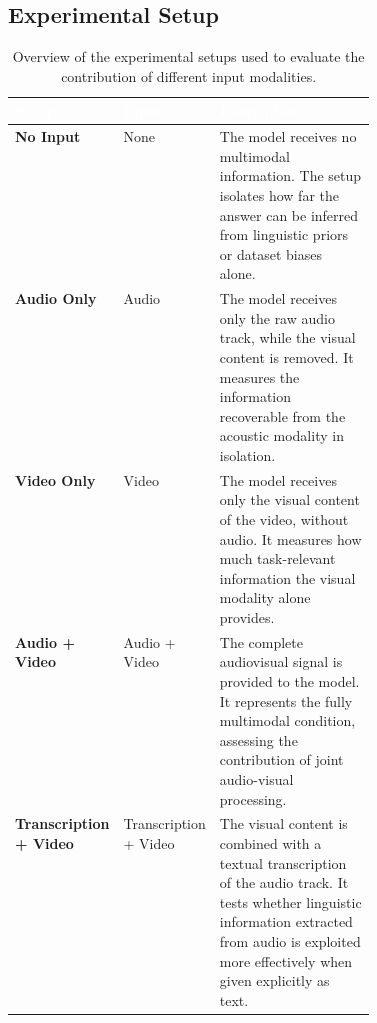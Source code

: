 \subsection*{Experimental Setup}
\begin{table}[h]
    \centering
    \small
    \renewcommand{\arraystretch}{1.35}

    \begin{tabularx}{\linewidth}{
        |>{\centering\arraybackslash}p{0.20\linewidth}
        |>{\centering\arraybackslash}p{0.22\linewidth}
        |X|
    }
        \hline

        \rowcolor{EcoForestGreen}
        \textcolor{white}{\textbf{Setup}} &
        \textcolor{white}{\textbf{Input}} &
        \textcolor{white}{\textbf{Description}} \\
        \hline

        \cellcolor{EcoForestGreen!20}
        \textbf{No Input} &
        None &
        The model receives no multimodal information. 
        The setup isolates how far the answer can be inferred from linguistic priors or dataset biases alone. \\
        \hline

        \cellcolor{EcoForestGreen!20}
        \textbf{Audio Only} &
        Audio &
        The model receives only the raw audio track, while the visual content is removed. 
        It measures the information recoverable from the acoustic modality in isolation. \\
        \hline

        \cellcolor{EcoForestGreen!20}
        \textbf{Video Only} &
        Video &
        The model receives only the visual content of the video, without audio. 
        It measures how much task-relevant information the visual modality alone provides. \\
        \hline

        \cellcolor{EcoForestGreen!20}
        \textbf{Audio + Video} &
        Audio + Video &
        The complete audiovisual signal is provided to the model. 
        It represents the fully multimodal condition, assessing the contribution of joint audio-visual processing. \\
        \hline

        \cellcolor{EcoForestGreen!20}
        \textbf{Transcription + Video} &
        Transcription + Video &
        The visual content is combined with a textual transcription of the audio track. 
        It tests whether linguistic information extracted from audio is exploited more effectively when given explicitly as text. \\
        \hline

    \end{tabularx}

    \caption{Overview of the experimental setups used to evaluate the contribution of different input modalities.}
    \label{tab:experimental-setups}
\end{table}
